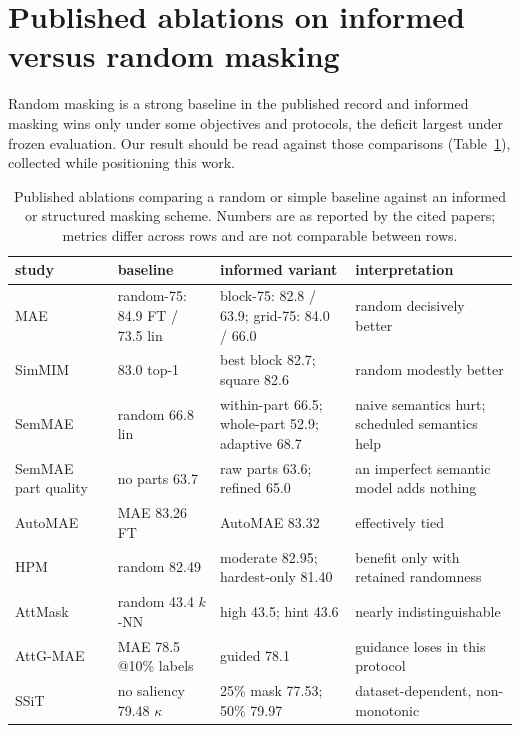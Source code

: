 \documentclass{article}
\begin{document}
\section{Published ablations on informed versus random masking}
\label{app:counter}

Random masking is a strong baseline in the published record and informed
masking wins only under some objectives and protocols, the deficit largest under
frozen evaluation. Our result should be read against those comparisons
(Table~\ref{tab:counter}), collected while positioning this work.

\begin{table}[h]
\centering
\caption{Published ablations comparing a random or simple baseline against an
informed or structured masking scheme. Numbers are as reported by the cited
papers; metrics differ across rows and are not comparable between rows.}
\label{tab:counter}
\footnotesize
\setlength{\tabcolsep}{4pt}
\begin{tabular}{p{2.1cm}p{3.0cm}p{4.0cm}p{3.6cm}}
\toprule
study & baseline & informed variant & interpretation \\
\midrule
MAE~\citep{he2022mae} & random-75: 84.9 FT / 73.5 lin & block-75: 82.8 / 63.9; grid-75: 84.0 / 66.0 & random decisively better \\
SimMIM~\citep{xie2022simmim} & 83.0 top-1 & best block 82.7; square 82.6 & random modestly better \\
SemMAE~\citep{li2022semmae} & random 66.8 lin & within-part 66.5; whole-part 52.9; adaptive 68.7 & naive semantics hurt; scheduled semantics help \\
SemMAE part quality~\citep{li2022semmae} & no parts 63.7 & raw parts 63.6; refined 65.0 & an imperfect semantic model adds nothing \\
AutoMAE~\citep{chen2023automae} & MAE 83.26 FT & AutoMAE 83.32 & effectively tied \\
HPM~\citep{wang2023hpm} & random 82.49 & moderate 82.95; hardest-only 81.40 & benefit only with retained randomness \\
AttMask~\citep{kakogeorgiou2022attmask} & random 43.4 $k$-NN & high 43.5; hint 43.6 & nearly indistinguishable \\
AttG-MAE~\citep{sick2025attg} & MAE 78.5 @10\% labels & guided 78.1 & guidance loses in this protocol \\
SSiT~\citep{huang2024ssit} & no saliency 79.48 $\kappa$ & 25\% mask 77.53; 50\% 79.97 & dataset-dependent, non-monotonic \\
\bottomrule
\end{tabular}
\end{table}
\end{document}
